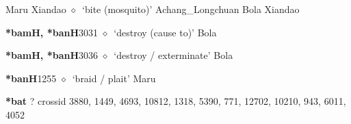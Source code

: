 \begin{list}{}{\leftmargin=1.5em \itemindent=-1.5em}
\hspace{1ex}
         Maru 
\hspace{1ex}
         Xiandao 
\hspace{1ex}
         $\diamond$~`bite (mosquito)'
         Achang\_Longchuan 
\hspace{1ex}
         Bola 
\hspace{1ex}
         Xiandao 
  \item {\footnotesize \textbf{*bamH, *banH}}{\tiny 3031}
\hspace{1ex}
         $\diamond$~`destroy (cause to)'
         Bola 
  \item {\footnotesize \textbf{*bamH, *banH}}{\tiny 3036}
\hspace{1ex}
         $\diamond$~`destroy / exterminate'
         Bola 
  \item {\footnotesize \textbf{*banH}}{\tiny 1255}
\hspace{1ex}
         $\diamond$~`braid / plait'
         Maru 
  \end{list}
\item
\textbf{*bat}
?
  {\tiny crossid 3880, 1449, 4693, 10812, 1318, 5390, 771, 12702, 10210, 943, 6011, 4052}
